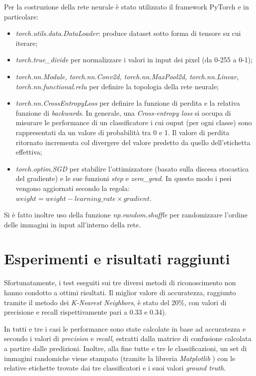 \documentclass[11pt, a4paper, titlepage]{article}
\begin{document}
\medskip 
Per la costruzione della rete neurale è stato utilizzato il framework PyTorch \cite{pytorch} e in particolare:
\begin{itemize}
    \item \emph{torch.utils.data.DataLoader}: produce dataset sotto forma di tensore su cui iterare;
    \item \emph{torch.true\_divide} per normalizzare i valori in input dei pixel (da 0-255 a 0-1);
    \item \emph{torch.nn.Module, torch.nn.Conv2d, torch.nn.MaxPool2d, torch.nn.Linear, torch.nn.functional.relu} per definire la topologia della rete neurale;
    \item \emph{torch.nn.CrossEntropyLoss} per definire la funzione di perdita e la relativa funzione di \emph{backwards}. In generale, una \emph{Cross-entropy loss} si occupa di misurare le performance di un classificatore i cui ouput (per ogni classe) sono rappresentati da un valore di probabilità tra 0 e 1. Il valore di perdita ritornato incrementa col divergere del valore predetto da quello dell'etichetta effettiva;
    \item \emph{torch.optim.SGD} per stabilire l'ottimizzatore (basato sulla discesa stocastica del gradiente) e le sue funzioni \emph{step} e \emph{zero\_grad}. In questo modo i pesi vengono aggiornati secondo la regola: $weight = weight - learning\_rate \times gradient$.
\end{itemize}

Si è fatto inoltre uso della funzione \emph{np.random.shuffle} \cite{numpy1}\cite{numpy2} per randomizzare l'ordine delle immagini in input all'interno della rete. 

\newpage
\section{Esperimenti e risultati raggiunti}
Sfortunatamente, i test eseguiti sui tre diversi metodi di riconoscimento non hanno condotto a ottimi risultati. Il miglior valore di accuratezza, raggiunto tramite il metodo dei \emph{K-Nearest Neighbors}, è stato del 20\%, con valori di precisione e recall rispettivamente pari a 0.33 e 0.34).

In tutti e tre i casi le performance sono state calcolate in base ad accuratezza e secondo i valori di \emph{precision} e \emph{recall}, estratti dalla matrice di confusione calcolata a partire dalle predizioni. Inoltre, alla fine tutte e tre le classificazioni, un set di immagini randomiche viene stampato (tramite la libreria \emph{Matplotlib} \cite{matplotlib}) con le relative etichette trovate dai tre classificatori e i suoi valori \emph{ground truth}.
\end{document}
